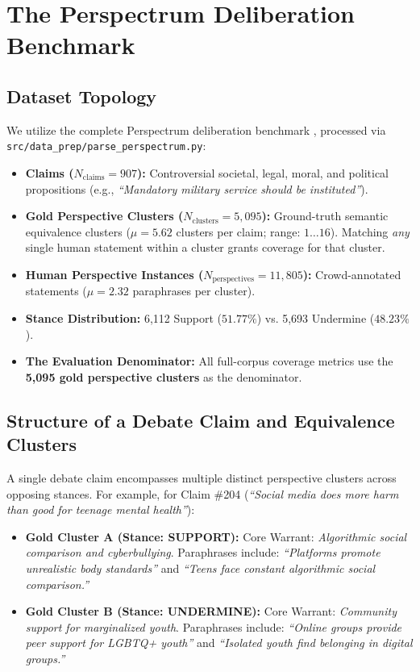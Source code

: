 \documentclass[11pt,a4paper]{article}
\begin{document}
\section{The Perspectrum Deliberation Benchmark}
\label{sec:perspectrum_dataset}

\subsection{Dataset Topology}
\label{subsec:dataset_topology}
We utilize the complete Perspectrum deliberation benchmark \citep{chen2019perspectrum}, processed via \texttt{src/data\_prep/parse\_perspectrum.py}:
\begin{itemize}[leftmargin=*,itemsep=1pt]
    \item \textbf{Claims ($N_{\text{claims}} = 907$):} Controversial societal, legal, moral, and political propositions (e.g., \textit{``Mandatory military service should be instituted''}).
    \item \textbf{Gold Perspective Clusters ($N_{\text{clusters}} = 5,095$):} Ground-truth semantic equivalence clusters ($\mu = 5.62$ clusters per claim; range: $1 \dots 16$). Matching \textit{any} single human statement within a cluster grants coverage for that cluster.
    \item \textbf{Human Perspective Instances ($N_{\text{perspectives}} = 11,805$):} Crowd-annotated statements ($\mu = 2.32$ paraphrases per cluster).
    \item \textbf{Stance Distribution:} 6,112 Support ($51.77\%$) vs. 5,693 Undermine ($48.23\%$).
    \item \textbf{The Evaluation Denominator:} All full-corpus coverage metrics use the \textbf{5,095 gold perspective clusters} as the denominator.
\end{itemize}

\subsection{Structure of a Debate Claim and Equivalence Clusters}
A single debate claim encompasses multiple distinct perspective clusters across opposing stances. For example, for Claim \#204 (\textit{``Social media does more harm than good for teenage mental health''}):
\begin{itemize}[leftmargin=*,itemsep=1pt]
    \item \textbf{Gold Cluster A (Stance: SUPPORT):} Core Warrant: \textit{Algorithmic social comparison and cyberbullying}. Paraphrases include: \textit{``Platforms promote unrealistic body standards''} and \textit{``Teens face constant algorithmic social comparison.''}
    \item \textbf{Gold Cluster B (Stance: UNDERMINE):} Core Warrant: \textit{Community support for marginalized youth}. Paraphrases include: \textit{``Online groups provide peer support for LGBTQ+ youth''} and \textit{``Isolated youth find belonging in digital groups.''}
\end{itemize}
\end{document}
